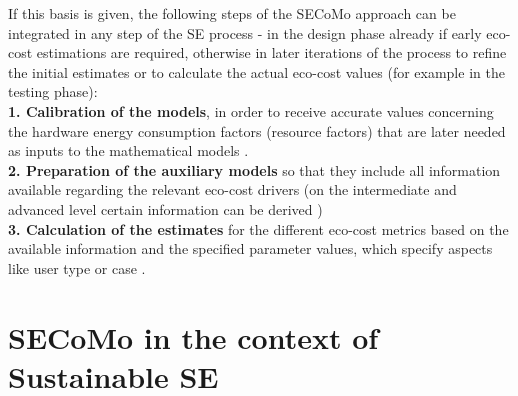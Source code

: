 \documentclass[oribibl]{llncs}
\begin{document}
If this basis is given, the following steps of the SECoMo approach can be integrated in any step of the SE process - in the design phase already if early eco-cost estimations are required, otherwise in later iterations of the process to refine the initial estimates or to calculate the actual eco-cost values (for example in the testing phase):\\
\textbf{1. Calibration of the models}, in order to receive accurate values concerning the hardware energy consumption factors (resource factors) that are later needed as inputs to the mathematical models \cite{schulze_cost_2016}.\\ %
\textbf{2. Preparation of the auxiliary models} so that they include all information available regarding the relevant eco-cost drivers (on the intermediate and advanced level certain information can be derived%
	) \cite{schulze_cost_2016.}\\ %
\textbf{3. Calculation of the estimates} for the different eco-cost metrics based on the available information %
	and the specified parameter values, which specify aspects like user type or case \cite{schulze_cost_2016}.



\section{SECoMo in the context of Sustainable SE}
\end{document}
